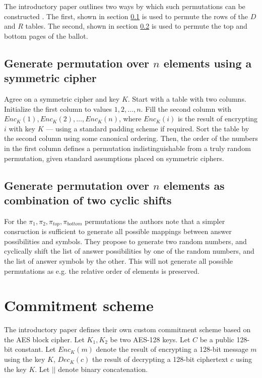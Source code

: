 The introductory paper outlines two ways by which such permutations can be
constructed \autocite[section 8]{fisherPunchscanIntroductionSystem2006}. The
first, shown in section \ref{sec:permutations_via_symmetric_cipher} is used to
permute the rows of the $D$ and $R$ tables. The second, shown in section
\ref{sec:permutations_via_shifts} is used to permute the top and bottom pages
of the ballot.

\subsection{Generate permutation over $n$ elements using a symmetric cipher}
\label{sec:permutations_via_symmetric_cipher}

Agree on a symmetric cipher and key $K$. Start with a table with two columns.
Initialize the first column to values $1, 2, \ldots, n$. Fill the second column
with $Enc_K(1), Enc_K(2), \ldots, Enc_K(n)$, where $Enc_K(i)$ is the result of
encrypting $i$ with key $K$ --- using a standard padding scheme if required.
Sort the table by the second column using some canonical ordering. Then, the
order of the numbers in the first column defines a permutation
indistinguishable from a truly random permutation, given standard assumptions
placed on symmetric ciphers.

\subsection{Generate permutation over $n$ elements as combination of two cyclic shifts}
\label{sec:permutations_via_shifts}

For the $\pi_1, \pi_2, \pi_{top}, \pi_{bottom}$ permutations the authors note
that a simpler consruction is sufficient to generate all possible mappings
between answer possibilities and symbols. They propose to generate two random
numbers, and cyclically shift the list of answer possibilities by one of the
random numbers, and the list of answer symbols by the other. This will not
generate all possible permutations as e.g. the relative order of elements is
preserved.

\section{Commitment scheme}

The introductory paper defines their own custom commitment scheme based on the
AES block cipher\autocite[section 9]{fisherPunchscanIntroductionSystem2006}.
Let $K_1, K_2$ be two AES-128 keys. Let $C$ be a public 128-bit constant. Let
$Enc_K(m)$ denote the result of encrypting a 128-bit message $m$ using the key
$K$, $Dec_K(c)$ the result of decrypting a 128-bit ciphertext $c$ using the key
$K$. Let $||$ denote binary concatenation.

